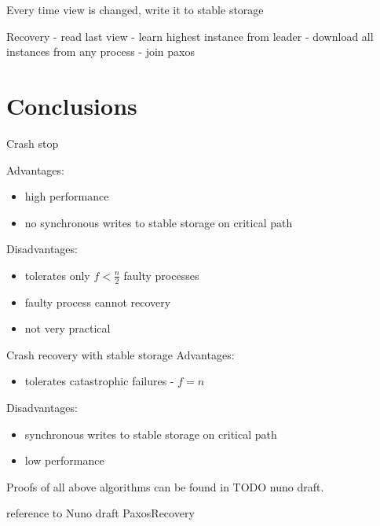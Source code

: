 \begin{TODO}
Every time view is changed, write it to stable storage

Recovery
- read last view
- learn highest instance from leader
- download all instances from any process
- join paxos
\end{TODO}


\section{Conclusions}

\begin{TODO}
Crash stop
\end{TODO}

Advantages:
\begin{itemize}
  \item high performance
  \item no synchronous writes to stable storage on critical path
\end{itemize}

Disadvantages:
\begin{itemize}
  \item tolerates only $f < \frac{n}{2}$ faulty processes
  \item faulty process cannot recovery 
  \item not very practical
\end{itemize}

Crash recovery with stable storage
Advantages:
\begin{itemize}
  \item tolerates catastrophic failures - $f = n$ 
\end{itemize}

Disadvantages:
\begin{itemize}
  \item synchronous writes to stable storage on critical path
  \item low performance
\end{itemize}


Proofs of all above algorithms can be found in TODO nuno draft.
\begin{TODO}
  reference to Nuno draft PaxosRecovery
\end{TODO}
